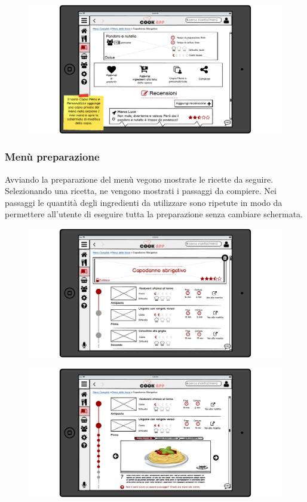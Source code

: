 \begin{figure}[H]
	\centering
	\includegraphics[width=0.95\linewidth]{img/mockup/menu-overview-3.png}
\end{figure}
\subsubsection{Menù preparazione}
Avviando la preparazione del menù vegono mostrate le ricette da seguire.
Selezionando una ricetta, ne vengono mostrati i passaggi da compiere.
Nei passaggi le quantità degli ingredienti da utilizzare sono ripetute
in modo da permettere all'utente di eseguire tutta la preparazione
senza cambiare schermata.
\begin{figure}[H]
	\centering
	\includegraphics[width=0.95\linewidth]{img/mockup/menu-preparazione.png}
\end{figure}
\begin{figure}[H]
	\centering
	\includegraphics[width=0.95\linewidth]{img/mockup/menu-preparazione-2.png}
\end{figure}
